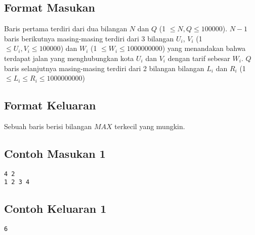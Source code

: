 \documentclass{article}
\begin{document}


\subsection*{Format Masukan}


Baris pertama terdiri dari dua bilangan $N$ dan $Q$ (1 $\leq N, Q \leq 100000$).
${N-1}$ baris berikutnya masing-masing terdiri dari 3 bilangan $U_i$, $V_i$ (1 $\leq U_i, V_i \leq 100000$) dan $W_i$ (1 $\leq W_i \leq 1000000000$) yang menandakan bahwa terdapat jalan yang 
menghubungkan kota $U_i$ dan $V_i$ dengan tarif sebesar $W_i$.
$Q$ baris selanjutnya masing-masing terdiri dari 2 bilangan bilangan $L_i$ dan $R_i$ (1 $\leq L_i \leq R_i \leq 1000000000$)

\subsection*{Format Keluaran}
Sebuah baris berisi bilangan $MAX$ terkecil yang mungkin.
\begin{multicols}{2}
\subsection*{Contoh Masukan 1}
\begin{lstlisting}
4 2
1 2 3 4
\end{lstlisting}
\vfill
\null
\columnbreak
\subsection*{Contoh Keluaran 1}
\begin{lstlisting}
6
\end{lstlisting}
\end{multicols}



\pagebreak
\end{document}
